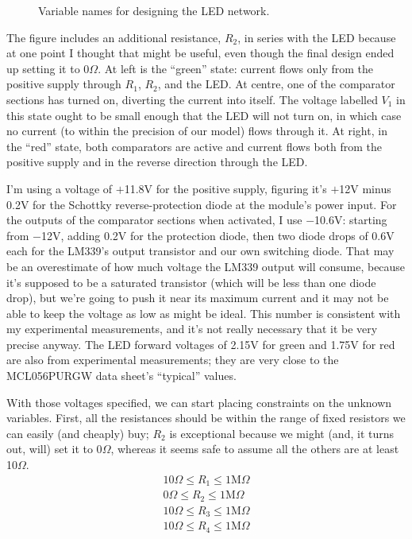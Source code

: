 \begin{figure}
{\centering\par}
\caption{Variable names for designing the LED
network.}\label{fig:led-design}
\end{figure}

The figure includes an additional resistance, $R_2$, in series with the LED
because at one point I thought that might be useful, even though the final
design ended up setting it to 0$\Omega$.  At left is the ``green'' state:
current flows only from the positive supply through $R_1$, $R_2$, and the
LED.  At centre, one of the comparator sections has turned on, diverting the
current into itself.  The voltage labelled $V_1$ in this state ought to be
small enough that the LED will not turn on, in which case no current (to
within the precision of our model) flows through it.  At right, in the
``red'' state, both comparators are active and current flows both from the
positive supply and in the reverse direction through the LED.

I'm using a voltage of $+$11.8V for the positive supply, figuring it's
$+$12V minus 0.2V for the Schottky reverse-protection diode at the module's
power input.  For the outputs of the comparator sections when activated, I
use $-$10.6V: starting from $-$12V, adding 0.2V for the protection diode,
then two diode drops of 0.6V each for the LM339's output transistor and our
own switching diode.  That may be an overestimate of how much voltage the
LM339 output will consume, because it's supposed to be a saturated
transistor (which will be less than one diode drop), but we're going to push
it near its maximum current and it may not be able to keep the voltage as
low as might be ideal.  This number is consistent with my experimental
measurements, and it's not really necessary that it be very precise anyway.
The LED forward voltages of 2.15V for green and 1.75V for red are also from
experimental measurements; they are very close to the MCL056PURGW data
sheet's ``typical'' values.

With those voltages specified, we can start placing constraints on the
unknown variables.  First, all the resistances should be within the range of
fixed resistors we can easily (and cheaply) buy; $R_2$ is exceptional
because we might (and, it turns out, will) set it to 0$\Omega$, whereas it
seems safe to assume all the others are at least 10$\Omega$.
\begin{gather*}
  10\Omega \le R_1 \le 1\textrm{M}\Omega \\
  0\Omega \le R_2 \le 1\textrm{M}\Omega \\
  10\Omega \le R_3 \le 1\textrm{M}\Omega \\
  10\Omega \le R_4 \le 1\textrm{M}\Omega
\end{gather*}

